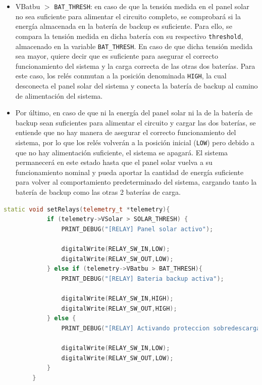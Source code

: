 \begin{itemize}
\begin{itemize}
        \item VBatbu $>$ \texttt{BAT\_THRESH}: en caso de que la tensión medida en el panel solar no sea suficiente para alimentar el circuito completo, se comprobará si la energía almacenada en la batería de backup es suficiente. Para ello, se compara la tensión medida en dicha batería con su respectivo \texttt{threshold}, almacenado en la variable \texttt{BAT\_THRESH}. En caso de que dicha tensión medida sea mayor, quiere decir que es suficiente para asegurar el correcto funcionamiento del sistema y la carga correcta de las otras dos baterías. Para este caso, los relés conmutan a la posición denominada \texttt{HIGH}, la cual desconecta el panel solar del sistema y conecta la batería de backup al camino de alimentación del sistema.
        \item Por último, en caso de que ni la energía del panel solar ni la de la batería de backup sean suficientes para alimentar el circuito y cargar las dos baterías, se entiende que no hay manera de asegurar el correcto funcionamiento del sistema, por lo que los relés volverán a la posición inicial (\texttt{LOW}) pero debido a que no hay alimentación suficiente, el sistema se apagará. El sistema permanecerá en este estado hasta que el panel solar vuelva a su funcionamiento nominal y pueda aportar la cantidad de energía suficiente para volver al comportamiento predeterminado del sistema, cargando tanto la batería de backup como las otras 2 baterías de carga.
    \end{itemize}
    \begin{lstlisting}[captionpos=b, caption={Desarrollo función setRelays}, language=c++]
        static void setRelays(telemetry_t *telemetry){
            if (telemetry->VSolar > SOLAR_THRESH) {
                PRINT_DEBUG("[RELAY] Panel solar activo");

                digitalWrite(RELAY_SW_IN,LOW);
                digitalWrite(RELAY_SW_OUT,LOW);
            } else if (telemetry->VBatbu > BAT_THRESH){
                PRINT_DEBUG("[RELAY] Bateria backup activa");

                digitalWrite(RELAY_SW_IN,HIGH);
                digitalWrite(RELAY_SW_OUT,HIGH);
            } else {
                PRINT_DEBUG("[RELAY] Activando proteccion sobredescarga. Se detendra el sistema");

                digitalWrite(RELAY_SW_IN,LOW);
                digitalWrite(RELAY_SW_OUT,LOW);
            }
        }
    \end{lstlisting}
\end{itemize}
